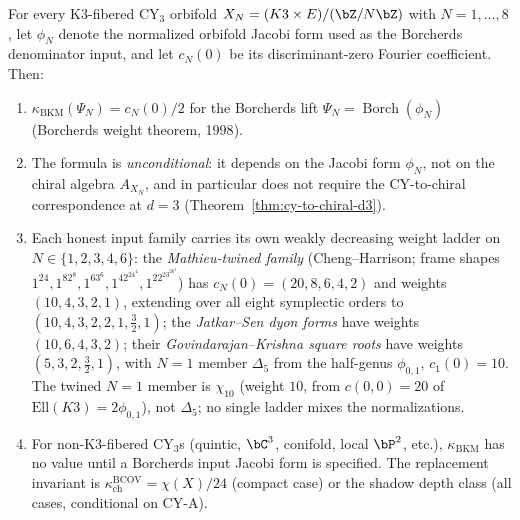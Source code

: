 \begin{proposition}
\label{prop:bkm-weight-universal}
For every K3-fibered CY$_3$ orbifold $X_N = (K3 \times E)/(\bZ/N\bZ)$ with $N = 1, \ldots, 8$, let $\phi_N$ denote the normalized orbifold Jacobi form used as the Borcherds denominator input, and let $c_N(0)$ be its discriminant-zero Fourier coefficient. Then:
\begin{enumerate}[label=\textup{(\roman*)}]
 \item $\kappa_{\mathrm{BKM}}(\Psi_N) = c_N(0)/2$ for the Borcherds lift $\Psi_N=\operatorname{Borch}(\phi_N)$ \textup{(}Borcherds weight theorem, 1998\textup{)}.
 \item The formula is \emph{unconditional}: it depends on the Jacobi form $\phi_N$, not on the chiral algebra $A_{X_N}$, and in particular does not require the CY-to-chiral correspondence at $d = 3$ \textup{(}Theorem~\ref{thm:cy-to-chiral-d3}\textup{)}.
 \item Each honest input family carries its own weakly decreasing weight ladder on $N \in \{1, 2, 3, 4, 6\}$: the \emph{Mathieu-twined family} (Cheng--Harrison; frame shapes $1^{24}, 1^82^8, 1^63^6, 1^42^24^4, 1^22^23^26^2$) has $c_N(0) = (20, 8, 6, 4, 2)$ and weights $(10, 4, 3, 2, 1)$, extending over all eight symplectic orders to $(10, 4, 3, 2, 2, 1, \tfrac32, 1)$; the \emph{Jatkar--Sen dyon forms} have weights $(10, 6, 4, 3, 2)$; their \emph{Govindarajan--Krishna square roots} have weights $(5, 3, 2, \tfrac32, 1)$, with $N = 1$ member $\Delta_5$ from the half-genus $\phi_{0,1}$, $c_1(0) = 10$. The twined $N = 1$ member is $\chi_{10}$ (weight $10$, from $c(0,0) = 20$ of $\mathrm{Ell}(K3) = 2\phi_{0,1}$), not $\Delta_5$; no single ladder mixes the normalizations.
 \item For non-K3-fibered CY$_3$s \textup{(}quintic, $\bC^3$, conifold, local $\bP^2$, etc.\textup{)}, $\kappa_{\mathrm{BKM}}$ has no value until a Borcherds input Jacobi form is specified. The replacement invariant is $\kappa_{\mathrm{ch}}^{\mathrm{BCOV}}=\chi(X)/24$ \textup{(}compact case\textup{)} or the shadow depth class \textup{(}all cases, conditional on CY-A\textup{)}.
\end{enumerate}
\end{proposition}

